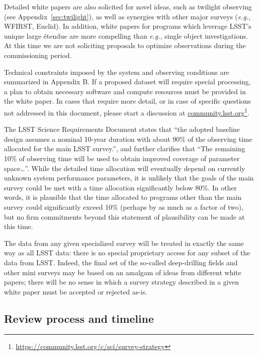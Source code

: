 \documentclass[DM,lsstdraft,toc,usenatbib]{lsstdoc}
\begin{document}
Detailed white papers are also solicited for novel ideas, such as twilight observing (see Appendix~\ref{sec:twilight}), 
as well as synergies with other major surveys ({\it e.g.}, WFIRST, Euclid). In addition, white papers for programs
which leverage LSST's unique large \'{e}tendue are more compelling than {\it e.g.,} single object investigations.  
At this time we are not soliciting proposals to optimize observations during the commissioning period.

Technical constraints imposed by the system and observing conditions are summarized in 
Appendix B. If a proposed dataset will require special processing, a plan to obtain necessary software and compute resources 
must be provided in the white paper. In cases that require more detail, or in case of specific questions not addressed in this 
document, please start a discussion at \href{http://community.lsst.org}{community.lsst.org}\footnote{\url{https://community.lsst.org/c/sci/survey-strategy}}.

The LSST Science Requirements Document states that ``the adopted baseline design assumes a 
nominal 10-year duration with about 90\% of the observing time allocated for the main LSST survey.'',
and further clarifies that ``The remaining 10\% of observing time will be used to obtain improved 
coverage of parameter space\dots''. While the detailed time allocation will eventually depend on currently unknown system
performance parameters, it is unlikely that the goals of the main survey could be met with a time allocation
significantly below 80\%. In other words, it is plausible that the time allocated to programs other
than the main survey could significantly exceed 10\% (perhaps by as much as a factor of two), but 
no firm commitments beyond this statement of plausibility can be made at this time. 

The data from any given specialized survey will be treated in exactly the same way as all LSST 
data: there is no special proprietary access for any subset of the data from LSST. Indeed, the final set of the so-called
deep-drilling fields and other mini surveys may be based on an amalgam of ideas from different 
white papers; there will be no sense in which a survey strategy described in a given white paper must be accepted or rejected as-is.  


\subsection{Review process and timeline}
\end{document}
